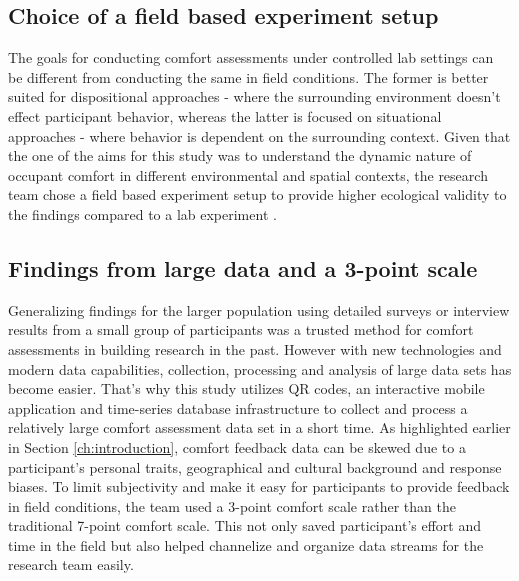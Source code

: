 
\subsection{Choice of a field based experiment setup}
The goals for conducting comfort assessments under controlled lab settings can be different from conducting the same in field conditions. The former is better suited for dispositional approaches - where the surrounding environment doesn't effect participant behavior, whereas the latter is focused on situational approaches - where behavior is dependent on the surrounding context.
Given that the one of the aims for this study was to understand the dynamic nature of occupant comfort in different environmental and spatial contexts, the research team chose a field based experiment setup to provide higher ecological validity to the findings compared to a lab experiment \cite{andrade2018internal}.           


\subsection{Findings from large data and a 3-point scale}

Generalizing findings for the larger population using detailed surveys or interview results from a small group of participants was a trusted method for comfort assessments in building research in the past. However with new technologies and modern data capabilities, collection, processing and analysis of large data sets has become easier. That's why this study utilizes QR codes, an interactive mobile application and time-series database infrastructure to collect and process a relatively large comfort assessment data set in a short time. As highlighted earlier in Section \ref{ch:introduction}, comfort feedback data can be skewed due to a participant's personal traits, geographical and cultural background and response biases. To limit subjectivity and make it easy for participants to provide feedback in field conditions, the team used a 3-point comfort scale rather than the traditional 7-point comfort scale. This not only saved participant's effort and time in the field but also helped channelize and organize data streams for the research team easily.\\




